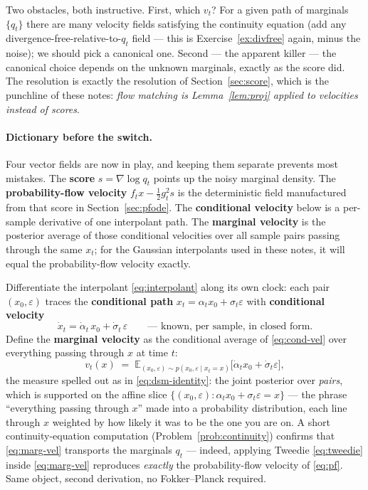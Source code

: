 \documentclass[10pt,a4paper]{article}
\newcommand{\E}{\mathbb{E}}
\newcommand{\score}{s}
\newcommand{\veps}{\varepsilon}
\begin{document}
Two obstacles, both instructive. First, which $v_t$? For a given path of
marginals $\{q_t\}$ there are many velocity fields satisfying the
continuity equation (add any divergence-free-relative-to-$q_t$ field ---
this is Exercise~\ref{ex:divfree} again, minus the noise);
we should pick a canonical one. Second --- the apparent killer --- the
canonical choice depends on the unknown marginals, exactly as the score
did. The resolution is exactly the resolution of Section~\ref{sec:score},
which is the punchline of these notes: \emph{flow matching is
Lemma~\ref{lem:proj} applied to velocities instead of scores}.

\paragraph{Dictionary before the switch.}
Four vector fields are now in play, and keeping them separate prevents
most mistakes. The \textbf{score} $\score=\nabla\log q_t$ points up the
noisy marginal density. The \textbf{probability-flow velocity}
$f_t x-\tfrac12 g_t^2\score$ is the deterministic field manufactured
from that score in Section~\ref{sec:pfode}. The \textbf{conditional
velocity} below is a per-sample derivative of one interpolant path. The
\textbf{marginal velocity} is the posterior average of those conditional
velocities over all sample pairs passing through the same $x_t$; for the
Gaussian interpolants used in these notes, it will equal the
probability-flow velocity exactly.

Differentiate the interpolant \eqref{eq:interpolant} along its own clock:
each pair $(x_0, \veps)$ traces the \textbf{conditional path}
$x_t = \alpha_t x_0 + \sigma_t \veps$ with \textbf{conditional velocity}
\begin{equation}
\dot x_t = \dot\alpha_t\, x_0 + \dot\sigma_t\, \veps
\qquad \text{--- known, per sample, in closed form.}
\label{eq:cond-vel}
\end{equation}
Define the \textbf{marginal velocity} as the conditional average of
\eqref{eq:cond-vel} over everything passing through $x$ at time $t$:
\begin{equation}
v_t(x) \;=\; \E_{(x_0, \veps) \sim p(x_0, \veps \mid x_t = x)}
\big[ \dot\alpha_t x_0 + \dot\sigma_t \veps \big],
\label{eq:marg-vel}
\end{equation}
the measure spelled out as in \eqref{eq:dsm-identity}: the joint
posterior over \emph{pairs}, which is supported on the affine slice
$\{(x_0, \veps) : \alpha_t x_0 + \sigma_t \veps = x\}$ --- the phrase
``everything passing through $x$'' made into a probability
distribution, each line through $x$ weighted by how likely it was to be
the one you are on.
A short continuity-equation computation (Problem~\ref{prob:continuity})
confirms that \eqref{eq:marg-vel} transports the marginals $q_t$ ---
indeed, applying Tweedie \eqref{eq:tweedie} inside \eqref{eq:marg-vel}
reproduces \emph{exactly} the probability-flow velocity of \eqref{eq:pf}.
Same object, second derivation, no Fokker--Planck required.
\end{document}
